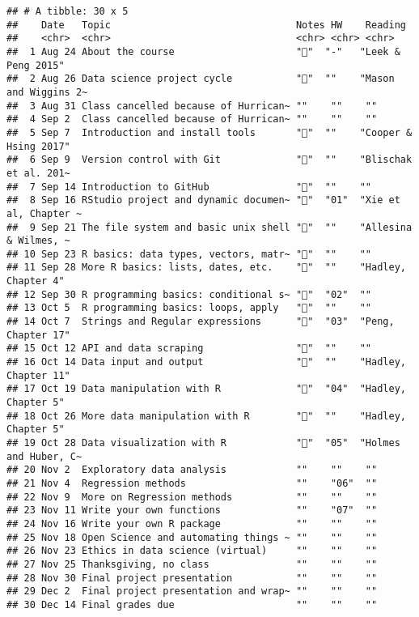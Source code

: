 \documentclass[
]{article}
\begin{document}
\begin{verbatim}
## # A tibble: 30 x 5
##    Date   Topic                                Notes HW    Reading              
##    <chr>  <chr>                                <chr> <chr> <chr>                
##  1 Aug 24 About the course                     "📙"  "-"   "Leek & Peng 2015"   
##  2 Aug 26 Data science project cycle           "📙"  ""    "Mason and Wiggins 2~
##  3 Aug 31 Class cancelled because of Hurrican~ ""    ""    ""                   
##  4 Sep 2  Class cancelled because of Hurrican~ ""    ""    ""                   
##  5 Sep 7  Introduction and install tools       "📙"  ""    "Cooper & Hsing 2017"
##  6 Sep 9  Version control with Git             "📙"  ""    "Blischak et al. 201~
##  7 Sep 14 Introduction to GitHub               "📙"  ""    ""                   
##  8 Sep 16 RStudio project and dynamic documen~ "📙"  "01"  "Xie et al, Chapter ~
##  9 Sep 21 The file system and basic unix shell "📙"  ""    "Allesina & Wilmes, ~
## 10 Sep 23 R basics: data types, vectors, matr~ "📙"  ""    ""                   
## 11 Sep 28 More R basics: lists, dates, etc.    "📙"  ""    "Hadley, Chapter 4"  
## 12 Sep 30 R programming basics: conditional s~ "📙"  "02"  ""                   
## 13 Oct 5  R programming basics: loops, apply   "📙"  ""    ""                   
## 14 Oct 7  Strings and Regular expressions      "📙"  "03"  "Peng, Chapter 17"   
## 15 Oct 12 API and data scraping                "📙"  ""    ""                   
## 16 Oct 14 Data input and output                "📙"  ""    "Hadley, Chapter 11" 
## 17 Oct 19 Data manipulation with R             "📙"  "04"  "Hadley, Chapter 5"  
## 18 Oct 26 More data manipulation with R        "📙"  ""    "Hadley, Chapter 5"  
## 19 Oct 28 Data visualization with R            "📙"  "05"  "Holmes and Huber, C~
## 20 Nov 2  Exploratory data analysis            ""    ""    ""                   
## 21 Nov 4  Regression methods                   ""    "06"  ""                   
## 22 Nov 9  More on Regression methods           ""    ""    ""                   
## 23 Nov 11 Write your own functions             ""    "07"  ""                   
## 24 Nov 16 Write your own R package             ""    ""    ""                   
## 25 Nov 18 Open Science and automating things ~ ""    ""    ""                   
## 26 Nov 23 Ethics in data science (virtual)     ""    ""    ""                   
## 27 Nov 25 Thanksgiving, no class               ""    ""    ""                   
## 28 Nov 30 Final project presentation           ""    ""    ""                   
## 29 Dec 2  Final project presentation and wrap~ ""    ""    ""                   
## 30 Dec 14 Final grades due                     ""    ""    ""
\end{verbatim}
\end{document}
